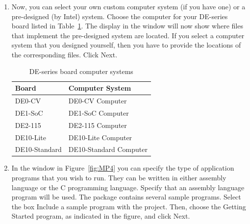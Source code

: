 \documentclass[epsfig,10pt,fullpage]{article}
\begin{document}
\begin{enumerate}
\item Now, you can select your own custom computer system (if you have one) or a 
pre-designed (by Intel) system. Choose the computer for your DE-series board listed in Table~\ref{tab:computer_systems}.  
The display in the window will now show where files that implement the pre-designed system are 
located. If you select a computer system that you designed yourself, then you have to 
provide the locations of the corresponding files. Click {\sf Next}.

\begin{table}[H]
	\begin{center}
	\begin{tabular}{ l | l }
	\bf{Board} & \bf{Computer System} \\
	\hline
	\rule{0pt}{3ex}DE0-CV & DE0-CV Computer \\ 
	DE1-SoC & DE1-SoC Computer \\
	DE2-115 & DE2-115 Computer \\
	DE10-Lite & DE10-Lite Computer \\
	DE10-Standard & DE10-Standard Computer \\
	\end{tabular}
	\caption{DE-series board computer systems}
	\label{tab:computer_systems}
	\end{center}
\end{table}

\item In the window in Figure~\ref{fig:MP4} you can specify the type of application 
programs that you wish to run. They can be written in either assembly language
or the C programming language.  Specify that an assembly language program will be used. 
The \productNameMed{} package contains several sample programs.
Select the box {\sf Include a sample program with the project}.
Then, choose the {\sf Getting Started} program, as indicated in the figure, and 
click {\sf Next}.


\end{enumerate}
\end{document}
